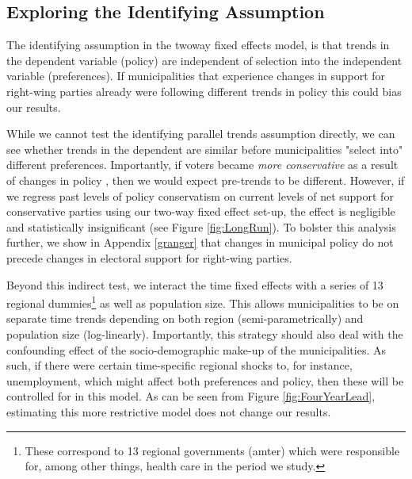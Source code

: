 \documentclass[a4paper,12pt]{article}
\begin{document}
\subsection*{Exploring the Identifying Assumption}
The identifying assumption in the twoway fixed effects model, is that trends in the dependent variable (policy) are independent of selection into the independent variable (preferences). If municipalities that experience changes in support for right-wing parties already were following different trends in policy this could bias our results. 

While we cannot test the identifying parallel trends assumption directly, we can see whether trends in the dependent are similar before municipalities "select into" different preferences. Importantly, if voters became \emph{more conservative} as a result of changes in policy \cite[cf.][]{lenz2013follow,slothuus2010can}, then we would expect pre-trends to be different. However, if we regress past levels of policy conservatism on current levels of net support for conservative parties using our two-way fixed effect set-up, the effect is negligible and statistically insignificant (see Figure \ref{fig:LongRun}). To  bolster this analysis further,  we show in Appendix \ref{granger} that changes in municipal policy do not precede changes in electoral support for right-wing parties.

Beyond this indirect test,  we interact the time fixed effects with a series of 13 regional dummies\footnote{These correspond to  13 regional governments (amter) which were responsible for, among other things, health care in the period we study.} as well as population size. This allows municipalities to be on separate time trends depending on both region (semi-parametrically) and population size (log-linearly). Importantly, this strategy should also deal with the confounding effect of the socio-demographic make-up of the municipalities. As such, if there were certain time-specific regional shocks to, for instance, unemployment, which might affect both preferences and policy, then these will be controlled for in this model. As can be seen from Figure \ref{fig:FourYearLead}, estimating this more restrictive model does not change our results.
\end{document}
